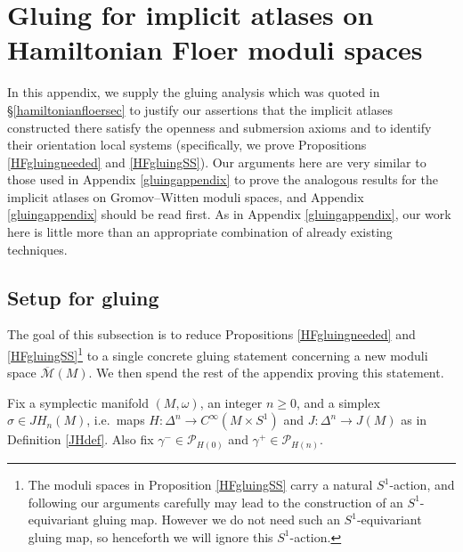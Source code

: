 \documentclass[12pt]{article}
\theoremstyle{definition}
\theoremstyle{remark}
\numberwithin{equation}{subsection}
\newcommand{\PPP}{\mathcal P}
\newcommand{\Mbar}{\overline{\mathcal M}}
\newcommand{\JH}{J\!H}
\begin{document}
\section{Gluing for implicit atlases on Hamiltonian Floer moduli spaces}\label{gluingHF}

In this appendix, we supply the gluing analysis which was quoted in \S\ref{hamiltonianfloersec} to justify our assertions that the implicit atlases constructed there satisfy the openness and submersion axioms and to identify their orientation local systems (specifically, we prove Propositions \ref{HFgluingneeded} and \ref{HFgluingSS}).  Our arguments here are very similar to those used in Appendix \ref{gluingappendix} to prove the analogous results for the implicit atlases on Gromov--Witten moduli spaces, and Appendix \ref{gluingappendix} should be read first.  As in Appendix \ref{gluingappendix}, our work here is little more than an appropriate combination of already existing techniques.

\subsection{Setup for gluing}\label{hfgluingsetup}

The goal of this subsection is to reduce Propositions \ref{HFgluingneeded} and \ref{HFgluingSS}\footnote{The moduli spaces in Proposition \ref{HFgluingSS} carry a natural $S^1$-action, and following our arguments carefully may lead to the construction of an $S^1$-equivariant gluing map.  However we do not need such an $S^1$-equivariant gluing map, so henceforth we will ignore this $S^1$-action.} to a single concrete gluing statement concerning a new moduli space $\Mbar(M)$.  We then spend the rest of the appendix proving this statement.

Fix a symplectic manifold $(M,\omega)$, an integer $n\geq 0$, and a simplex $\sigma\in\JH_n(M)$, i.e.\ maps $H:\Delta^n\to C^\infty(M\times S^1)$ and $J:\Delta^n\to J(M)$ as in Definition \ref{JHdef}.  Also fix $\gamma^-\in\PPP_{H(0)}$ and $\gamma^+\in\PPP_{H(n)}$.
\end{document}
